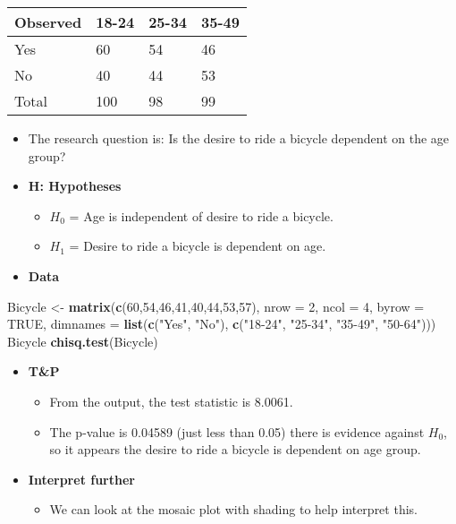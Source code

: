 \documentclass[]{article}
\newenvironment{Shaded}{\begin{snugshade}}{\end{snugshade}}
\newcommand{\DataTypeTok}[1]{\textcolor[rgb]{0.13,0.29,0.53}{#1}}
\newcommand{\DecValTok}[1]{\textcolor[rgb]{0.00,0.00,0.81}{#1}}
\newcommand{\KeywordTok}[1]{\textcolor[rgb]{0.13,0.29,0.53}{\textbf{#1}}}
\newcommand{\NormalTok}[1]{#1}
\newcommand{\OtherTok}[1]{\textcolor[rgb]{0.56,0.35,0.01}{#1}}
\newcommand{\StringTok}[1]{\textcolor[rgb]{0.31,0.60,0.02}{#1}}
\providecommand{\tightlist}{%
  \setlength{\itemsep}{0pt}\setlength{\parskip}{0pt}}
\begin{document}
\begin{longtable}[]{@{}llll@{}}
\toprule
Observed & 18-24 & 25-34 & 35-49\tabularnewline
\midrule
\endhead
Yes & 60 & 54 & 46\tabularnewline
No & 40 & 44 & 53\tabularnewline
Total & 100 & 98 & 99\tabularnewline
\bottomrule
\end{longtable}

\begin{itemize}
\item
  The research question is: Is the desire to ride a bicycle dependent on the age group?
\item
  \textbf{H: Hypotheses}

  \begin{itemize}
  \item
    \(H_0\) = Age is independent of desire to ride a bicycle.
  \item
    \(H_1\) = Desire to ride a bicycle is dependent on age.
  \end{itemize}
\item
  \textbf{Data}
\end{itemize}

\begin{Shaded}
\begin{Highlighting}[]
\NormalTok{Bicycle <-}\StringTok{ }\KeywordTok{matrix}\NormalTok{(}\KeywordTok{c}\NormalTok{(}\DecValTok{60}\NormalTok{,}\DecValTok{54}\NormalTok{,}\DecValTok{46}\NormalTok{,}\DecValTok{41}\NormalTok{,}\DecValTok{40}\NormalTok{,}\DecValTok{44}\NormalTok{,}\DecValTok{53}\NormalTok{,}\DecValTok{57}\NormalTok{), }\DataTypeTok{nrow =} \DecValTok{2}\NormalTok{, }\DataTypeTok{ncol =} \DecValTok{4}\NormalTok{, }\DataTypeTok{byrow =} \OtherTok{TRUE}\NormalTok{, }\DataTypeTok{dimnames =} \KeywordTok{list}\NormalTok{(}\KeywordTok{c}\NormalTok{(}\StringTok{"Yes"}\NormalTok{, }\StringTok{"No"}\NormalTok{), }\KeywordTok{c}\NormalTok{(}\StringTok{"18-24"}\NormalTok{, }\StringTok{"25-34"}\NormalTok{, }\StringTok{"35-49"}\NormalTok{, }\StringTok{"50-64"}\NormalTok{)))}
\NormalTok{Bicycle}
\KeywordTok{chisq.test}\NormalTok{(Bicycle)}
\end{Highlighting}
\end{Shaded}

\begin{itemize}
\item
  \textbf{T\&P}

  \begin{itemize}
  \item
    From the output, the test statistic is 8.0061.
  \item
    The p-value is 0.04589 (just less than 0.05) there is evidence against \(H_0\), so it appears the desire to ride a bicycle is dependent on age group.
  \end{itemize}
\item
  \textbf{Interpret further}

  \begin{itemize}
  \tightlist
  \item
    We can look at the mosaic plot with shading to help interpret this.
  \end{itemize}
\end{itemize}
\end{document}
